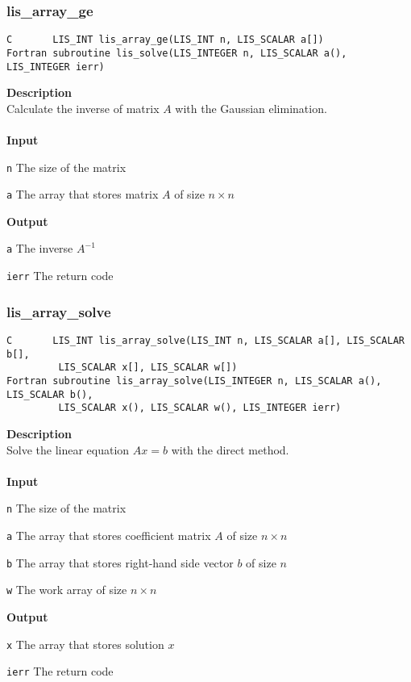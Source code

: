 \documentclass[a4paper]{article}
\newcommand{\namelistlabel}[1]{\mbox{#1}\hfill}
\newenvironment{namelist}[1]{%
\begin{list}{}
  {\let\makelabel\namelistlabel
  \settowidth{\labelwidth}{#1}
  \setlength{\leftmargin}{1.1\labelwidth}}
  }{%
\end{list}}
\begin{document}
\newpage
\subsubsection{lis\_array\_ge}
\begin{screen}
\verb|C       LIS_INT lis_array_ge(LIS_INT n, LIS_SCALAR a[])|\\
\verb|Fortran subroutine lis_solve(LIS_INTEGER n, LIS_SCALAR a(), LIS_INTEGER ierr)|
\end{screen}
{\bf Description}\\
\indent
Calculate the inverse of matrix $A$ with the Gaussian elimination.
\\ \\
\noindent
{\bf Input}
\begin{namelist}{XXXXXXXXXXXXXXXXXXXX}
\item[\tt n] The size of the matrix
\item[\tt a] The array that stores matrix $A$ of size $n \times n$
\end{namelist}
{\bf Output}
\begin{namelist}{XXXXXXXXXXXXXXXXXXXX}
\item[\tt a] The inverse $A^{-1}$
\item[\tt ierr] The return code
\end{namelist}

\subsubsection{lis\_array\_solve}
\begin{screen}
\verb|C       LIS_INT lis_array_solve(LIS_INT n, LIS_SCALAR a[], LIS_SCALAR b[],|\\
\verb|         LIS_SCALAR x[], LIS_SCALAR w[])|\\
\verb|Fortran subroutine lis_array_solve(LIS_INTEGER n, LIS_SCALAR a(), LIS_SCALAR b(),|\\
\verb|         LIS_SCALAR x(), LIS_SCALAR w(), LIS_INTEGER ierr)|
\end{screen}
{\bf Description}\\
\indent
Solve the linear equation $Ax = b$ with the direct method.
\\ \\
\noindent
{\bf Input}
\begin{namelist}{XXXXXXXXXXXXXXXXXXXX}
\item[\tt n] The size of the matrix
\item[\tt a] The array that stores coefficient matrix $A$ of size $n \times n$
\item[\tt b] The array that stores right-hand side vector $b$ of size $n$
\item[\tt w] The work array of size $n \times n$
\end{namelist}
{\bf Output}
\begin{namelist}{XXXXXXXXXXXXXXXXXXXX}
\item[\tt x] The array that stores solution $x$
\item[\tt ierr] The return code
\end{namelist}
\end{document}
